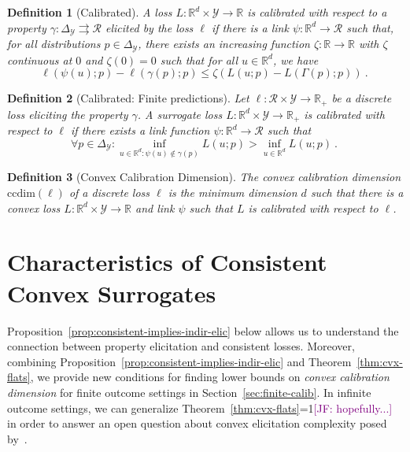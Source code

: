 \documentclass{article}
\newcommand{\Comments}{1}
\newcommand{\mynote}[2]{\ifnum\Comments=1\textcolor{#1}{#2}\fi}
\newcommand{\jessie}[1]{\mynote{purple}{[JF: #1]}}
\newcommand{\reals}{\mathbb{R}}
\newcommand{\simplex}{\Delta_\Y}
\newcommand{\ccdim}{\mathrm{ccdim}}
\newcommand{\R}{\mathcal{R}}
\newcommand{\Y}{\mathcal{Y}}
\newcommand{\toto}{\rightrightarrows}
\newtheorem{definition}{Definition}
\begin{document}
\begin{definition}[Calibrated]\label{def:calibrated-general}
	A loss $L:\reals^d \times \Y \to \reals$ is \emph{calibrated} with respect to a property $\gamma : \simplex \toto \R$ elicited by the loss $\ell$ if there is a link $\psi : \reals^d \to \R$ such that, for all distributions $p \in \simplex$, there exists an increasing function $\zeta : \reals \to \reals$ with $\zeta$ continuous at $0$ and $\zeta(0) = 0$ such that for all $u \in \reals^d$, we have
	\begin{equation}
	\ell( \psi(u); p) - \ell(\gamma(p); p)  \leq \zeta \left(  L(u;p) - L(\Gamma(p); p) \right)~.~
	\end{equation}
\end{definition}
\begin{definition}[Calibrated: Finite predictions]\label{def:calibrated-finite}
	Let $\ell : \R \times \Y \to \reals_+$ be a discrete loss eliciting the property $\gamma$.
	A surrogate loss $L : \reals^d \times \Y \to \reals_+$ is \emph{calibrated} with respect to $\ell$ if there exists a link function $\psi: \reals^d \to \R$ such that
	\begin{equation}\label{eq:calibration}
	\forall p \in \simplex: \inf_{u \in \reals^d : \psi(u) \not \in \gamma(p)} L(u;p) > \inf_{u \in \reals^d} L(u;p)~.~
	\end{equation}
\end{definition}

\begin{definition}[Convex Calibration Dimension]
	The \emph{convex calibration dimension} $\ccdim(\ell)$ of a discrete loss $\ell$ is the minimum dimension $d$ such that there is a convex loss $L: \reals^d \times \Y \to \reals$ and link $\psi$ such that $L$ is calibrated with respect to $\ell$.
\end{definition}

\section{Characteristics of Consistent Convex Surrogates}\label{sec:char-convex}

Proposition~\ref{prop:consistent-implies-indir-elic} below allows us to understand the connection between property elicitation and consistent losses.
Moreover, combining Proposition~\ref{prop:consistent-implies-indir-elic} and Theorem~\ref{thm:cvx-flats}, we provide new conditions for finding lower bounds on \emph{convex calibration dimension} for finite outcome settings in Section~\ref{sec:finite-calib}.
In infinite outcome settings, we can generalize Theorem~\ref{thm:cvx-flats}\jessie{hopefully...} in order to answer an open question about convex elicitation complexity posed by~\cite{frongillo2015elicitation}.
\end{document}
